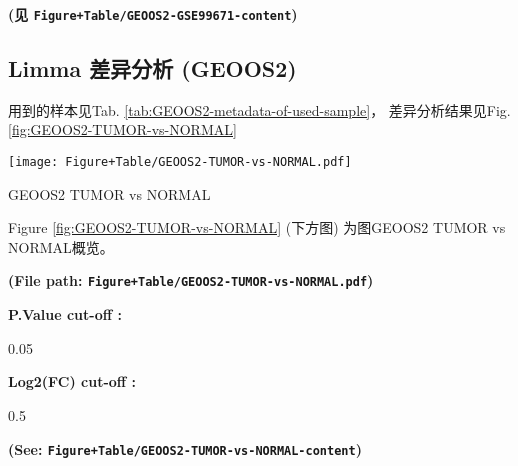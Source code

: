 \documentclass[
]{article}
\begin{document}
\textbf{(见 \texttt{Figure+Table/GEOOS2-GSE99671-content})}

\hypertarget{limma-ux5deeux5f02ux5206ux6790-geoos2}{%
\subsection{Limma 差异分析 (GEOOS2)}\label{limma-ux5deeux5f02ux5206ux6790-geoos2}}

用到的样本见Tab. \ref{tab:GEOOS2-metadata-of-used-sample}，
差异分析结果见Fig. \ref{fig:GEOOS2-TUMOR-vs-NORMAL}

\begin{center}\vspace{1.5cm}\end{center}
\def\@captype{figure}
\begin{center}
\texttt{[image: Figure+Table/GEOOS2-TUMOR-vs-NORMAL.pdf]}
\caption{GEOOS2 TUMOR vs NORMAL}\label{fig:GEOOS2-TUMOR-vs-NORMAL}
\end{center}

Figure \ref{fig:GEOOS2-TUMOR-vs-NORMAL} (下方图) 为图GEOOS2 TUMOR vs NORMAL概览。

\textbf{(File path: \texttt{Figure+Table/GEOOS2-TUMOR-vs-NORMAL.pdf})}

\begin{center}\vspace{1.5cm}\end{center}\begin{center}\begin{tcolorbox}[colback=gray!10, colframe=gray!50, width=0.9\linewidth, arc=1mm, boxrule=0.5pt]
\textbf{
P.Value cut-off
:}

\vspace{0.5em}

    0.05

\vspace{2em}


\textbf{
Log2(FC) cut-off
:}

\vspace{0.5em}

    0.5

\vspace{2em}
\end{tcolorbox}
\end{center}

\textbf{(See: \texttt{Figure+Table/GEOOS2-TUMOR-vs-NORMAL-content})}
\end{document}
